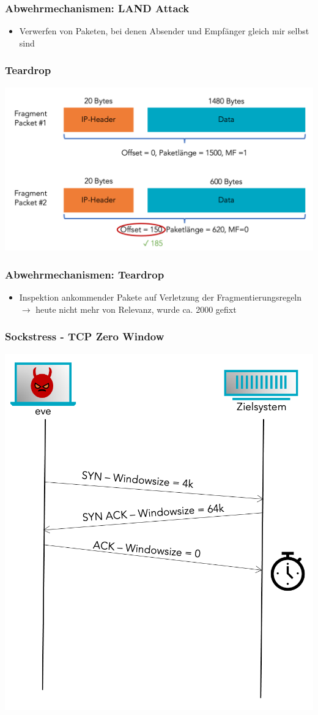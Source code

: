 \documentclass{beamer}
\begin{document}
\begin{frame}
	\frametitle{Abwehrmechanismen: LAND Attack}
	\begin{itemize}
		\item Verwerfen von Paketen, bei denen Absender und Empfänger gleich mir selbst sind
	\end{itemize}
\end{frame}

\begin{frame}
	\frametitle{Teardrop}
	\begin{center}
		\includegraphics[width=0.9\linewidth]{img/TeardropAttack}
	\end{center}
\end{frame}

\begin{frame}
	\frametitle{Abwehrmechanismen: Teardrop}
	\begin{itemize}
		\item Inspektion ankommender Pakete auf Verletzung der Fragmentierungsregeln \\ $\rightarrow$ heute nicht mehr von Relevanz, wurde ca. 2000 gefixt
	\end{itemize}
\end{frame}

\begin{frame}
	\frametitle{Sockstress - TCP Zero Window}
	\begin{center}
		\includegraphics[width=0.6\linewidth]{img/zerowin}
	\end{center}
\end{frame}
\end{document}
